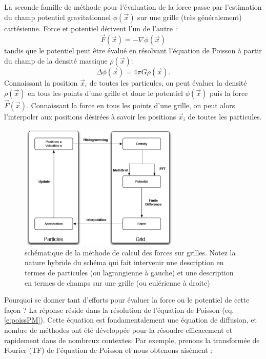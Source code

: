 La seconde famille de méthode pour l'évaluation de la force passe par l'estimation du champ potentiel gravitationnel $\phi(\vec x)$ sur une grille (très généralement) cartésienne. Force et potentiel dérivent l'un de l'autre :
\begin{equation}
\vec F (\vec x) =-\nabla \phi(\vec x)
\end{equation}
tandis que le potentiel peut être évalué en résolvant l'équation de Poisson à partir du champ de la densité massique $\rho(\vec x)$:
\begin{equation}
\Delta \phi(\vec x) = 4\pi G \rho(\vec x).
\label{e:poissPM}
\end{equation}
Connaissant la position $\vec x_i$ de toutes les particules, on peut évaluer la densité  $\rho(\vec x)$ en tous les points d'une grille et donc le potentiel $\phi(\vec x)$ puis la force $\vec F(\vec x)$. Connaissant la force en tous les points d'une grille, on peut alors l'interpoler aux positions désirées à savoir les positions $\vec x_i$ de toutes les particules.
\begin{figure}[htbp]
	\centering
		\includegraphics[height=6cm]{figs/PM.png}
	\caption[schématique de la méthode de calcul des forces sur grilles.]{schématique de la méthode de calcul des forces sur grilles. Notez la nature hybride du schéma qui fait intervenir une description en termes de particules (ou lagrangienne à gauche) et une description en termes de champs sur une grille (ou eulérienne à droite)}
	\label{f:PM}
\end{figure}
Pourquoi se donner tant d'efforts pour évaluer la force ou le potentiel de cette façon ? La réponse réside dans la résolution de l'équation de Poisson (eq. \ref{e:poissPM}). Cette équation est fondamentalement une équation de diffusion, et nombre de méthodes ont été développée pour la résoudre efficacement et rapidement dans de nombreux contextes. Par exemple, prenons la transformée de Fourier (TF) de l'équation de Poisson et nous obtenons aisément : 
